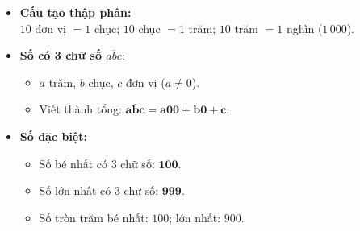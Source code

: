 \documentclass[10pt,a4paper]{article}
\begin{document}
\noindent
\begin{minipage}[t]{0.49\textwidth}\vspace{0pt}
\begin{tcolorbox}[
  enhanced,
  colback=violet!4!white,
  colframe=violet!75!black,
  arc=2mm, boxrule=0.8pt,
  left=2mm, right=2mm, top=1.8mm, bottom=1.8mm,
  title={\footnotesize\bfseries\color{white}\faKey\ 1. Trọng tâm kiến thức số học 1000}
]
{\footnotesize
\begin{itemize}\setlength{\itemsep}{1pt}\setlength{\leftskip}{-2.5mm}
  \item \textbf{Cấu tạo thập phân:}\\
  $10$ đơn vị $= 1$ chục; $10$ chục $= 1$ trăm; $10$ trăm $= 1$ nghìn ($1\,000$).
  \item \textbf{Số có 3 chữ số $\overline{abc}$}:
  \begin{itemize}\setlength{\itemsep}{0.5pt}\setlength{\leftskip}{-2mm}
    \item $a$ trăm, $b$ chục, $c$ đơn vị ($a \neq 0$).
    \item Viết thành tổng: $\mathbf{\overline{abc} = a00 + b0 + c}$.
  \end{itemize}
  \item \textbf{Số đặc biệt:}
  \begin{itemize}\setlength{\itemsep}{0.5pt}\setlength{\leftskip}{-2mm}
    \item Số bé nhất có 3 chữ số: $\mathbf{100}$.
    \item Số lớn nhất có 3 chữ số: $\mathbf{999}$.
    \item Số tròn trăm bé nhất: $100$; lớn nhất: $900$.
  \end{itemize}
\end{itemize}
}
\end{tcolorbox}
\end{minipage}
\hfill
\end{document}
